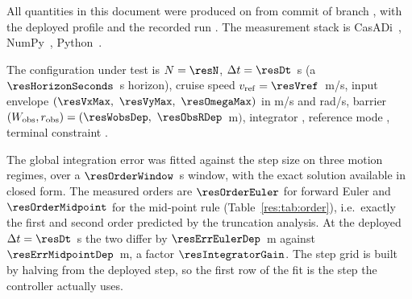 
All quantities in this document were produced on \resDate from commit \texttt{\resCommit} of branch \texttt{\resBranch}, with the deployed profile \resProfile and the recorded run \resBag. The measurement stack is CasADi~\resCasadi, NumPy~\resNumpy, Python~\resPython.

The configuration under test is $N=\resN$, $\Delta t=\resDt$~s (a $\resHorizonSeconds$~s horizon), cruise speed $v_{\mathrm{ref}}=\resVref$~m/s, input envelope $(\resVxMax,\ \resVyMax,\ \resOmegaMax)$ in m/s and rad/s, barrier $(\Wobs,\robs)=(\resWobsDep,\ \resObsRDep$~m$)$, integrator \texttt{\resIntegrator}, reference mode \texttt{\resPathMode}, terminal constraint \texttt{\resTerminalMode}.

\begin{center}\end{center}



\begin{table}[htbp]
  \centering
  \small
  \caption{Destination of each block of measurements. The report sections are named by their label, not by their number, because the numbering is still going to change.}
  \label{res:tab:map}
\end{table}

\label{res:disc}


The global integration error was fitted against the step size on three motion regimes, over a $\resOrderWindow$~s window, with the exact solution available in closed form. The measured orders are $\resOrderEuler$ for forward Euler and $\resOrderMidpoint$ for the mid-point rule (Table~\ref{res:tab:order}), i.e.\ exactly the first and second order predicted by the truncation analysis. At the deployed $\Delta t=\resDt$~s the two differ by $\resErrEulerDep$~m against $\resErrMidpointDep$~m, a factor $\resIntegratorGain$. The step grid is built by halving from the deployed step, so the first row of the fit is the step the controller actually uses.

